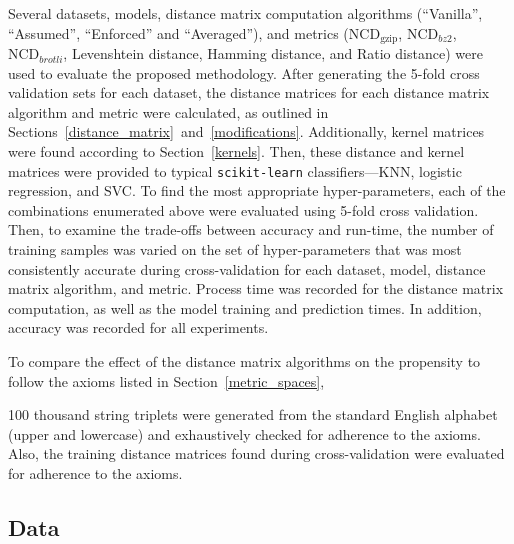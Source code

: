 \documentclass[preprint,12pt]{article}
\begin{document}
Several datasets, models, distance matrix computation algorithms (``Vanilla'', ``Assumed'', ``Enforced'' and ``Averaged''), and metrics ($\text{NCD}_{\text{gzip}}$, $\text{NCD}_{bz2}$, $\text{NCD}_{brotli}$, Levenshtein distance, Hamming distance, and Ratio distance) were used to evaluate the proposed methodology.
After generating the 5-fold cross validation sets for each dataset, the distance matrices for each distance matrix algorithm and metric were calculated, as outlined in Sections~\ref{distance_matrix}~and~\ref{modifications}.
Additionally, kernel matrices were found according to Section~\ref{kernels}.
Then, these distance and kernel matrices were provided to typical \texttt{scikit-learn} classifiers---KNN, logistic regression, and SVC.
To find the most appropriate hyper-parameters, each of the combinations enumerated above were evaluated using 5-fold cross validation. 
Then, to examine the trade-offs between accuracy and run-time, the number of training samples was varied on the set of hyper-parameters that was most consistently accurate during cross-validation for each dataset, model, distance matrix algorithm, and metric.
Process time was recorded for the distance matrix computation, as well as the model training and prediction times.
In addition, accuracy was recorded for all experiments.

To compare the effect of the distance matrix algorithms on the propensity to follow the axioms listed in Section~\ref{metric_spaces},

100 thousand string triplets were generated from the standard English alphabet (upper and lowercase) and exhaustively checked for adherence to the axioms.
Also, the training distance matrices found during cross-validation were evaluated for adherence to the axioms.



\subsection{Data}
\label{datasets}
\end{document}
